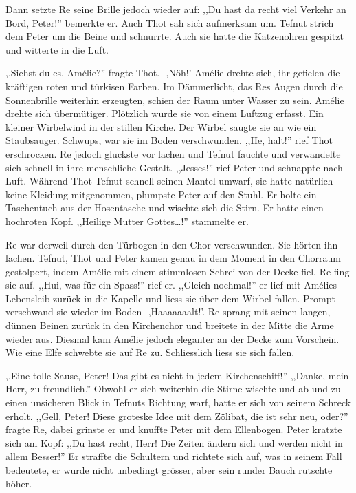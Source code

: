 \documentclass[11pt,titlepage,a5paper]{book}
\begin{document}
Dann setzte Re seine Brille jedoch wieder auf: ,,Du hast da recht viel Verkehr an Bord, Peter!'' bemerkte er. Auch Thot sah sich aufmerksam um. Tefnut strich dem Peter um die Beine und schnurrte. Auch sie hatte die Katzenohren gespitzt und witterte in die Luft.

,,Siehst du es, Amélie?'' fragte Thot. -,Nöh!' Amélie drehte sich, ihr gefielen die kräftigen roten und türkisen Farben. Im Dämmerlicht, das Res Augen durch die Sonnenbrille weiterhin erzeugten, schien der Raum unter Wasser zu sein. Amélie drehte sich übermütiger. Plötzlich wurde sie von einem Luftzug erfasst. Ein kleiner Wirbelwind in der stillen Kirche. Der Wirbel saugte sie an wie ein Staubsauger. Schwups, war sie im Boden verschwunden. ,,He, halt!'' rief Thot erschrocken. Re jedoch gluckste vor lachen und Tefnut fauchte und verwandelte sich schnell in ihre menschliche Gestalt. ,,Jesses!'' rief Peter und schnappte nach Luft. Während Thot Tefnut schnell seinen Mantel umwarf, sie hatte natürlich keine Kleidung mitgenommen, plumpste Peter auf den Stuhl. Er holte ein Taschentuch aus der Hosentasche und wischte sich die Stirn. Er hatte einen hochroten Kopf. ,,Heilige Mutter Gottes\dots!'' stammelte er.

Re war derweil durch den Türbogen in den Chor verschwunden. Sie hörten ihn lachen. Tefnut, Thot und Peter kamen genau in dem Moment in den Chorraum gestolpert, indem Amélie mit einem stimmlosen Schrei von der Decke fiel. Re fing sie auf. ,,Hui, was für ein Spass!'' rief er. ,,Gleich nochmal!'' er lief mit Amélies Lebensleib zurück in die Kapelle und liess sie über dem Wirbel fallen. Prompt verschwand sie wieder im Boden -,Haaaaaaalt!'. Re sprang mit seinen langen, dünnen Beinen zurück in den Kirchenchor und breitete in der Mitte die Arme wieder aus. Diesmal kam Amélie jedoch eleganter an der Decke zum Vorschein. Wie eine Elfe schwebte sie auf Re zu. Schliesslich liess sie sich fallen.

,,Eine tolle Sause, Peter! Das gibt es nicht in jedem Kirchenschiff!'' ,,Danke, mein Herr, zu freundlich.'' Obwohl er sich weiterhin die Stirne wischte und ab und zu einen unsicheren Blick in Tefnuts Richtung warf, hatte er sich von seinem Schreck erholt. ,,Gell, Peter! Diese groteske Idee mit dem Zölibat, die ist sehr neu, oder?'' fragte Re, dabei grinste er und knuffte Peter mit dem Ellenbogen. Peter kratzte sich am Kopf: ,,Du hast recht, Herr! Die Zeiten ändern sich und werden nicht in allem Besser!'' Er straffte die Schultern und richtete sich auf, was in seinem Fall bedeutete, er wurde nicht unbedingt grösser, aber sein runder Bauch rutschte höher.
\end{document}
